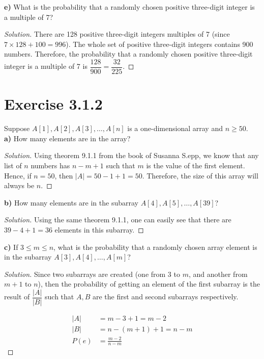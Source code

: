 \documentclass[titlepage, letterpaper, fleqn]{article}
\newcommand{\spacepls}{\vspace{5mm}}
\renewcommand\qedsymbol{\(\blacksquare\)}
\newenvironment{solution}
{\renewcommand\qedsymbol{$\square$}\begin{proof}[Solution]}
{\end{proof}}
\begin{document}
\spacepls

{\large \textbf{e)} What is the probability that a randomly chosen positive three-digit integer is a multiple of 7?}

\begin{solution}
There are 128 positive three-digit integers multiples of 7 (since \(7 \times 128 + 100 = 996\)).
The whole set of positive three-digit integers contains 900 numbers.
Therefore, the probability that a randomly chosen positive three-digit integer is a multiple of 7 is \(\dfrac{128}{900} = \dfrac{32}{225}\).
\end{solution}

\spacepls

\section{Exercise 3.1.2}

{\large Suppose \(A[1], A[2], A[3], \dots, A[n]\) is a one-dimensional array and \(n \geq 50\).\\
\textbf{a)} How many elements are in the array?}

\begin{solution}
Using theorem 9.1.1 from the book of Susanna S.epp, we know that any list of \(n\) numbers has \(n - m + 1\) such that \(m\) is the value of the first element. Hence, if \(n = 50\), then \(|A| = 50 - 1 + 1 = 50\). Therefore, the size of this array will always be \(n\).
\end{solution}

\spacepls

{\large \textbf{b)} How many elements are in the subarray \(A[4], A[5],\dots , A[39]\)?}

\begin{solution}
Using the same theorem 9.1.1, one can easily see that there are \(39 - 4 + 1 = 36\) elements in this subarray.
\end{solution}

\spacepls

{\large \textbf{c)} If \(3 \leq m \leq n\), what is the probability that a randomly chosen array element is in the subarray \(A[3], A[4], \dots, A[m]\)}?

\begin{solution}
Since two subarrays are created (one from 3 to \(m\), and another from \(m+1\) to \(n\)), then the probability of getting an element of the first subarray is the result of \(\dfrac{|A|}{|B|}\) such that \(A,B\) are the first and second subarrays respectively.

\begin{align*}
|A| & = m - 3 + 1 = m - 2 \\
|B| & = n - (m + 1) + 1 = n - m \\[2ex]
P(e) &= \frac{m-2}{n-m}
\end{align*}
\end{solution}
\end{document}
